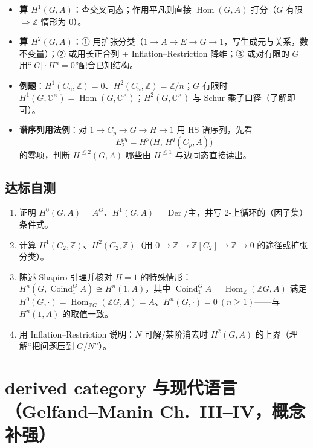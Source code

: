 \documentclass[12pt,a4paper]{ctexart}
\DeclareMathOperator{\Hom}{Hom}
\DeclareMathOperator{\Der}{Der}
\begin{document}
\begin{itemize}
  \item \textbf{算 $H^1(G,A)$}：查交叉同态；作用平凡则直接 $\Hom(G,A)$ 打分（$G$ 有限 $\Rightarrow\mathbb Z$ 情形为 $0$）。
  \item \textbf{算 $H^2(G,A)$}：① 用扩张分类（$1\to A\to E\to G\to1$，写生成元与关系，数不变量）；② 或用长正合列 + Inflation--Restriction 降维；③ 或对有限的 $G$ 用“$|G|\cdot H^n=0$”配合已知结构。
  \item \textbf{例题}：$H^1(C_n,\mathbb Z)=0$、$H^2(C_n,\mathbb Z)=\mathbb Z/n$；$G$ 有限时 $H^1(G,\mathbb C^\times)=\Hom(G,\mathbb C^\times)$；$H^2(G,\mathbb C^\times)$ 与 Schur 乘子口径（了解即可）。
  \item \textbf{谱序列用法例}：对 $1\to C_p\to G\to H\to1$ 用 HS 谱序列，先看
  \[
    E_2^{pq}=H^p\bigl(H,\,H^q(C_p,A)\bigr)
  \]
  的零项，判断 $H^{\le2}(G,A)$ 哪些由 $H^{\le1}$ 与边同态直接读出。
\end{itemize}

\subsection{达标自测}
\begin{enumerate}[label=(\arabic*)]
  \item 证明 $H^0(G,A)=A^G$、$H^1(G,A)=\Der/\text{主}$，并写 $2$-上循环的（因子集）条件式。
  \item 计算 $H^1(C_2,\mathbb Z)$、$H^2(C_2,\mathbb Z)$（用 $0\to\mathbb Z\to\mathbb Z[C_2]\to\mathbb Z\to0$ 的途径或扩张分类）。
  \item 陈述 Shapiro 引理并核对 $H=1$ 的特殊情形：$H^n(G,\operatorname{Coind}_1^G A)\cong H^n(1,A)$，其中 $\operatorname{Coind}_1^G A=\Hom_\mathbb Z(\mathbb ZG,A)$ 满足 $H^0(G,\cdot)=\Hom_{\mathbb ZG}(\mathbb ZG,A)=A$、$H^n(G,\cdot)=0\ (n\ge1)$——与 $H^n(1,A)$ 的取值一致。
  \item 用 Inflation--Restriction 说明：$N$ 可解/某阶消去时 $H^2(G,A)$ 的上界（理解“把问题压到 $G/N$”）。
\end{enumerate}

\section{derived category 与现代语言（Gelfand--Manin Ch.~III--IV，概念补强）}
\end{document}
